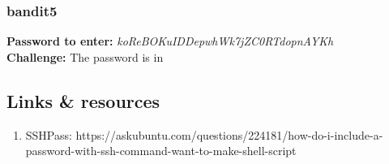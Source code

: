 \documentclass[a4paper]{article}
\newcommand{\pass}[1]{\textbf{Password to enter:} \textit{#1}\\}
\newcommand{\chall}{\textbf{Challenge:} }
\begin{document}
\subsubsection{bandit5}
\pass{koReBOKuIDDepwhWk7jZC0RTdopnAYKh}
\chall The password is in 

\subsection{Links \& resources}
\begin{enumerate}
\item SSHPass: https://askubuntu.com/questions/224181/how-do-i-include-a-password-with-ssh-command-want-to-make-shell-script
\end{enumerate}
\end{document}
